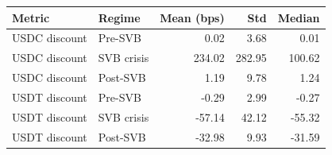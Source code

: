 \begin{tabular}{llrrr}
\toprule
Metric & Regime & Mean (bps) & Std & Median \\
\midrule
USDC discount & Pre-SVB & 0.02 & 3.68 & 0.01 \\
USDC discount & SVB crisis & 234.02 & 282.95 & 100.62 \\
USDC discount & Post-SVB & 1.19 & 9.78 & 1.24 \\
USDT discount & Pre-SVB & -0.29 & 2.99 & -0.27 \\
USDT discount & SVB crisis & -57.14 & 42.12 & -55.32 \\
USDT discount & Post-SVB & -32.98 & 9.93 & -31.59 \\
\bottomrule
\end{tabular}
